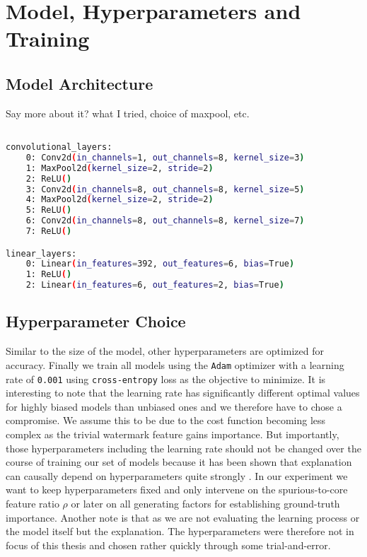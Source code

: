\section{Model, Hyperparameters and Training}\label{appendix:model}

\subsection{Model Architecture}
Say more about it? what I tried, choice of maxpool, etc.
\begin{lstlisting}[language=bash, label=lst:cnnmodel]

convolutional_layers: 
    0: Conv2d(in_channels=1, out_channels=8, kernel_size=3)
    1: MaxPool2d(kernel_size=2, stride=2)
    2: ReLU()
    3: Conv2d(in_channels=8, out_channels=8, kernel_size=5)
    4: MaxPool2d(kernel_size=2, stride=2)
    5: ReLU()
    6: Conv2d(in_channels=8, out_channels=8, kernel_size=7)
    7: ReLU()

linear_layers:
    0: Linear(in_features=392, out_features=6, bias=True)
    1: ReLU()
    2: Linear(in_features=6, out_features=2, bias=True)  

\end{lstlisting}



\subsection{Hyperparameter Choice}
Similar to the size of the model, other hyperparameters are optimized for accuracy.
Finally we train all models using the \verb|Adam| optimizer  with a learning rate of \verb|0.001| using \verb|cross-entropy| loss  as the objective to minimize.
It is interesting to note that the learning rate has significantly different optimal values for highly biased models than unbiased ones and we therefore have to chose a compromise. We assume this to be due to the cost function becoming less complex as the trivial watermark feature gains importance.
But importantly, those hyperparameters including the learning rate should not be changed over the course of training our set of models because it has been shown that explanation can causally depend on hyperparameters quite strongly \cite{Karimi2023}. In our experiment we want to keep hyperparameters fixed and only intervene on the spurious-to-core feature ratio $\rho$ or later on all generating factors for establishing ground-truth importance. Another note is that as we are not evaluating the learning process or the model itself but the explanation. The hyperparameters were therefore not in focus of this thesis and chosen rather quickly through some trial-and-error.

